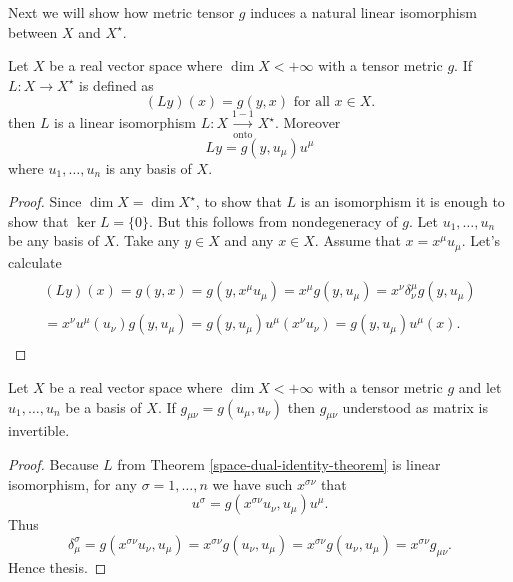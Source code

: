 \documentclass[main.tex]{subfiles}
\begin{document}
Next we will show how metric tensor $g$ induces a natural linear isomorphism between $X$ and $X^\star$.

\begin{theorem}
\label{space-dual-identity-theorem}
Let $X$ be a real vector space where $\dim X < +\infty$ with a tensor metric $g$. If $L: X\to X^\star$ is defined as
\begin{equation}
(Ly)(x) = g(y, x) \text{ for all } x\in X. 
\end{equation}
then $L$ is a linear isomorphism  $L:X\underset{\text{onto}}{\overset{1-1}{\to}} X^\star$.
Moreover
\begin{equation}
\label{space-dual-identity}
L y = g(y, u_\mu) u^\mu
\end{equation} 
where $u_1, \dots, u_n$ is any basis of $X$.
\end{theorem}
\begin{proof}
Since $\dim X = \dim X^\star$, to show that $L$ is an isomorphism it is enough to show that $\ker L = \{0\}$. But this follows from nondegeneracy of $g$. Let $u_1, \dots, u_n$ be any basis of $X$.  Take any $y\in X$ and any $x\in X$. Assume that $x = x^\mu u_\mu$.
Let's calculate
\begin{multline*}
\\
(Ly)(x) = g(y, x) = g(y, x^\mu u_\mu)= x^\mu g(y, u_\mu) = x^\nu \delta^\mu_\nu g(y, u_\mu)\\
\\ = x^\nu u^\mu(u_\nu) g(y, u_\mu) = g(y, u_\mu) u^\mu(x^\nu u_\nu) = g(y,u_\mu)u^\mu(x).
\\
\end{multline*} 
\end{proof}

\begin{lemma}
\label{metric-tensor-inversibility}
Let $X$ be a real vector space where $\dim X < +\infty$ with a tensor metric $g$ and let $u_1, \dots, u_n$ be a basis of $X$. If $g_{\mu\nu} = g(u_\mu, u_\nu)$ then $g_{\mu\nu}$ understood as matrix is invertible.
\end{lemma}
\begin{proof}
Because $L$ from Theorem \ref{space-dual-identity-theorem} is linear isomorphism, for any $\sigma = 1, \dots, n$ we have such $x^{\sigma\nu}$ that
\begin{equation}
u^\sigma = g(x^{\sigma\nu} u_\nu, u_\mu) u^\mu.
\end{equation}
Thus 
\begin{equation}
\delta^\sigma_\mu = g(x^{\sigma\nu} u_\nu, u_\mu) = x^{\sigma\nu} g(u_\nu, u_\mu) = x^{\sigma\nu} g(u_\nu, u_\mu) = x^{\sigma\nu} g_{\mu\nu}.
\end{equation}
Hence thesis.
\end{proof}
\end{document}
